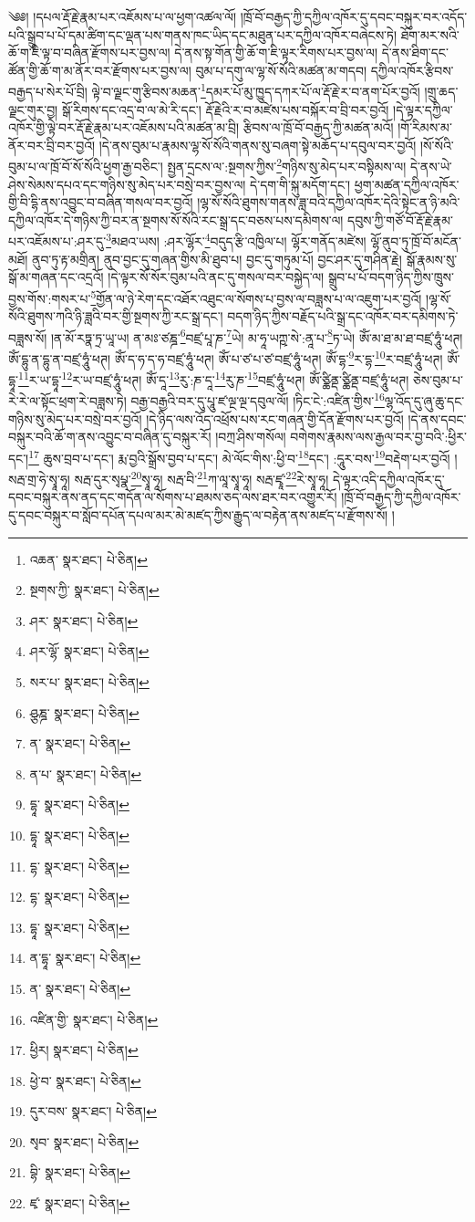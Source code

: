 \setcounter{footnote}{0} 
༄༅། །དཔལ་རྡོ་རྗེ་རྣམ་པར་འཇོམས་པ་ལ་ཕྱག་འཚལ་ལོ། །ཁྲོ་བོ་བརྒྱད་ཀྱི་དཀྱིལ་འཁོར་དུ་དབང་བསྐུར་བར་འདོད་པའི་སྒྲུབ་པ་པོ་དམ་ཚིག་དང་ལྡན་པས་གནས་ཁང་ཡིད་དང་མཐུན་པར་དཀྱིལ་འཁོར་བཞེངས་ཏེ། ཐོག་མར་སའི་ཆོ་ག་ཇི་ལྟ་བ་བཞིན་རྫོགས་པར་བྱས་ལ། དེ་ནས་སྟ་གོན་གྱི་ཆོ་ག་ཇི་ལྟར་རིགས་པར་བྱས་ལ། དེ་ནས་ཐིག་དང་ཚོན་གྱི་ཆོ་ག་མ་ནོར་བར་རྫོགས་པར་བྱས་ལ། བུམ་པ་དགུ་ལ་ལྷ་སོ་སོའི་མཚན་མ་གདབ། དཀྱིལ་འཁོར་རྩིབས་བརྒྱད་པ་སེར་པོ་བྲི། ལྟེ་བ་ལྗང་གུ་རྩིབས་མཆན་\footnote{འཆན་  སྣར་ཐང་།  པེ་ཅིན། }དམར་པོ་མུ་ཁྱུད་དཀར་པོ་ལ་རྡོ་རྗེ་ར་བ་ནག་པོར་བྱའོ། །གྲུ་ཆད་ལྗང་གུར་བྱ། སྒོ་རིགས་དང་འདྲ་བ་ལ་མེ་རི་དང་། རྡོ་རྗེའི་ར་བ་མཛེས་པས་བསྐོར་བ་བྲི་བར་བྱའོ། །དེ་ལྟར་དཀྱིལ་འཁོར་གྱི་ལྟེ་བར་རྡོ་རྗེ་རྣམ་པར་འཇོམས་པའི་མཚན་མ་བྲི། རྩིབས་ལ་ཁྲོ་བོ་བརྒྱད་ཀྱི་མཚན་མའོ། །གོ་རིམས་མ་ནོར་བར་བྲི་བར་བྱའོ། །དེ་ནས་བུམ་པ་རྣམས་ལྷ་སོ་སོའི་གནས་སུ་བཞག་སྟེ་མཆོད་པ་དབུལ་བར་བྱའོ། །སོ་སོའི་བུམ་པ་ལ་ཁྲོ་བོ་སོ་སོའི་ཕྱག་རྒྱ་བཅིང་། སྤྱན་དྲངས་ལ་:སྔགས་ཀྱིས་\footnote{སྔགས་ཀྱི་  སྣར་ཐང་།  པེ་ཅིན། }གཉིས་སུ་མེད་པར་བསྟིམས་ལ། དེ་ནས་ཡེ་ཤེས་སེམས་དཔའ་དང་གཉིས་སུ་མེད་པར་བསྲེ་བར་བྱས་ལ། དེ་དག་གི་སྐུ་མདོག་དང་། ཕྱག་མཚན་དཀྱིལ་འཁོར་གྱི་བི་དྷི་ནས་འབྱུང་བ་བཞིན་གསལ་བར་བྱའོ། །ལྷ་སོ་སོའི་ཐུགས་གནས་ཟླ་བའི་དཀྱིལ་འཁོར་དེའི་སྟེང་ན་ཉི་མའི་དཀྱིལ་འཁོར་དེ་གཉིས་ཀྱི་བར་ན་སྔགས་སོ་སོའི་རང་སྒྲ་དང་བཅས་པས་དམིགས་ལ། དབུས་ཀྱི་གཙོ་བོ་རྡོ་རྗེ་རྣམ་པར་འཇོམས་པ་:ཤར་དུ་\footnote{ཤར་  སྣར་ཐང་།  པེ་ཅིན། }མཐའ་ཡས། :ཤར་ལྷོར་\footnote{ཤར་ལྷོ་  སྣར་ཐང་།  པེ་ཅིན། }བདུད་རྩི་འཁྱིལ་པ། ལྷོར་གནོད་མཛེས། ལྷོ་ནུབ་ཏུ་ཁྲོ་བོ་མངོན་མཐོ། ནུབ་ཏུ་རྟ་མགྲིན། ནུབ་བྱང་དུ་གཞན་གྱིས་མི་ཐུབ་པ། བྱང་དུ་གཏུམ་པོ། བྱང་ཤར་དུ་གཤིན་རྗེ། སྒོ་རྣམས་སུ་སྒོ་མ་གཞན་དང་འདྲའོ། །དེ་ལྟར་སོ་སོར་བུམ་པའི་ནང་དུ་གསལ་བར་བསྐྱེད་ལ། སྒྲུབ་པ་པོ་བདག་ཉིད་ཀྱིས་ཁྲུས་བྱས་གོས་:གསར་པ་\footnote{སར་པ་  སྣར་ཐང་།  པེ་ཅིན། }གྱོན་ལ་ཉེ་རེག་དང་འཐོར་འཐུང་ལ་སོགས་པ་བྱས་ལ་བཟླས་པ་ལ་འཇུག་པར་བྱའོ། །ལྷ་སོ་སོའི་ཐུགས་ཀའི་ཉི་ཟླའི་བར་གྱི་སྔགས་ཀྱི་རང་སྒྲ་དང་། བདག་ཉིད་ཀྱིས་བརྗོད་པའི་སྒྲ་དང་འཁོར་བར་དམིགས་ཏེ་བཟླས་སོ། །ན་མོ་རཏྣ་ཏྲ་ཡཱ་ཡ། ན་མཿ་ཙཎྜ་\footnote{ཤྩཎྜ་  སྣར་ཐང་།  པེ་ཅིན། }བཛྲ་པཱ་ཎ་\footnote{ན་  སྣར་ཐང་།  པེ་ཅིན། }ཡེ། མ་ཧཱ་ཡཀྵ་སེ་:ནཱ་པ་\footnote{ན་པ་  སྣར་ཐང་།  པེ་ཅིན། }ཏ་ཡེ། ཨོཾ་མ་ཐ་མ་ཐ་བཛྲ་ཧཱུཾ་ཕཊ། ཨོཾ་དྷུ་ན་དྷུ་ན་བཛྲ་ཧཱུཾ་ཕཊ། ཨོཾ་ད་ཧ་ད་ཧ་བཛྲ་ཧཱུཾ་ཕཊ། ཨོཾ་པ་ཙ་པ་ཙ་བཛྲ་ཧཱུཾ་ཕཊ། ཨོཾ་དྷ་\footnote{དྷཱ་  སྣར་ཐང་།  པེ་ཅིན། }ར་དྷ་\footnote{དྷཱ་  སྣར་ཐང་།  པེ་ཅིན། }ར་བཛྲ་ཧཱུཾ་ཕཊ། ཨོཾ་དྷཱ་\footnote{དྷ་  སྣར་ཐང་།  པེ་ཅིན། }ར་ཡ་དྷཱ་\footnote{དྷ་  སྣར་ཐང་།  པེ་ཅིན། }ར་ཡ་བཛྲ་ཧཱུཾ་ཕཊ། ཨོཾ་དཱ་\footnote{དྷཱ་  སྣར་ཐང་།  པེ་ཅིན། }རུ་:ཎ་དཱ་\footnote{ན་དྷཱ་  སྣར་ཐང་།  པེ་ཅིན། }རུ་ཎ་\footnote{ན་  སྣར་ཐང་།  པེ་ཅིན། }བཛྲ་ཧཱུཾ་ཕཊ། ཨོཾ་ཙྪིནྡ་ཙྪིནྡ་བཛྲ་ཧཱུཾ་ཕཊ། ཅེས་བུམ་པ་རེ་རེ་ལ་སྟོང་ཕྲག་རེ་བཟླས་ཏེ། བརྒྱ་བརྒྱའི་བར་དུ་པཱུ་ཛ་ལྔ་ལྔ་དབུལ་ལོ། །ཏིང་ངེ་:འཛིན་གྱིས་\footnote{འཛིན་གྱི་  སྣར་ཐང་།  པེ་ཅིན། }ལྷ་འོད་དུ་ཞུ་ཆུ་དང་གཉིས་སུ་མེད་པར་བསྲེ་བར་བྱའོ། །དེ་ཉིད་ལས་འོད་འཕྲོས་པས་རང་གཞན་གྱི་དོན་རྫོགས་པར་བྱའོ། །དེ་ནས་དབང་བསྐུར་བའི་ཆོ་ག་ནས་འབྱུང་བ་བཞིན་དུ་བསྐུར་རོ། །བཀྲ་ཤིས་གསོལ། བགེགས་རྣམས་ལས་རྒྱལ་བར་བྱ་བའི་:ཕྱིར་དང་།\footnote{ཕྱིར།  སྣར་ཐང་།  པེ་ཅིན། } ཆུས་བྲབ་པ་དང་། རྨ་བྱའི་སྒྲོས་བྱབ་པ་དང་། མེ་ལོང་གིས་:ཕྱི་བ་\footnote{ཕྱེ་བ་  སྣར་ཐང་།  པེ་ཅིན། }དང་། :དཱུར་བས་\footnote{དུར་བས་  སྣར་ཐང་།  པེ་ཅིན། }བརྡེག་པར་བྱའོ། །སརྦ་གྲ་ཧེ་སྭཱ་ཧཱ། སརྦ་དུར་སྭཔྣ་\footnote{སྭབ་  སྣར་ཐང་།  པེ་ཅིན། }སྭཱ་ཧཱ། སརྦ་བི་\footnote{བྷི་  སྣར་ཐང་།  པེ་ཅིན། }ཀ་ལཱ་སྭཱ་ཧཱ། སརྦ་ཛྭཱ་\footnote{ཛྭ་  སྣར་ཐང་།  པེ་ཅིན། }རེ་སྭཱ་ཧཱ། དེ་ལྟར་འདི་དཀྱིལ་འཁོར་དུ་དབང་བསྐུར་ནས་ནད་དང་གདོན་ལ་སོགས་པ་ཐམས་ཅད་ལས་ཐར་བར་འགྱུར་རོ། །ཁྲོ་བོ་བརྒྱད་ཀྱི་དཀྱིལ་འཁོར་དུ་དབང་བསྐུར་བ་སློབ་དཔོན་དཔལ་མར་མེ་མཛད་ཀྱིས་རྒྱུད་ལ་བརྟེན་ནས་མཛད་པ་རྫོགས་སོ། ། 